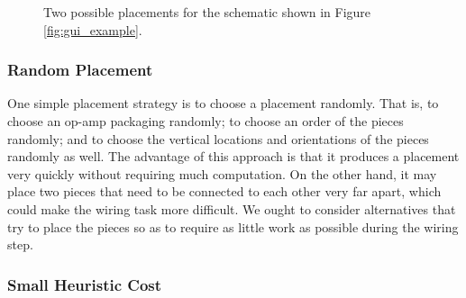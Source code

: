 \begin{figure}
\caption[Placement examples]{Two possible placements for the schematic shown in
Figure \ref{fig:gui_example}.}
\label{fig:sample_placements}
\end{figure}

\subsubsection{Random Placement}
\label{sec:random_placement}

One simple placement strategy is to choose a placement randomly.
That is, to choose
an op-amp packaging randomly; to choose an order of the pieces randomly; and to
choose the vertical locations and orientations of the pieces randomly as well.
The advantage of this
approach is that it produces a placement very quickly without requiring much
computation. On the other hand, it may place two pieces that need to be
connected to each other very far apart, which could make the wiring task more
difficult. We ought to consider alternatives that try to place the pieces so as
to require as little work as possible during the wiring step.

\subsubsection{Small Heuristic Cost}

